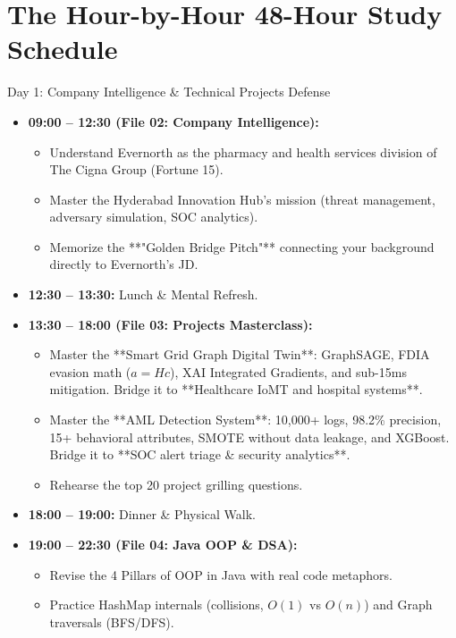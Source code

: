 \documentclass[11pt,a4paper]{article}
\begin{document}
\section{The Hour-by-Hour 48-Hour Study Schedule}

\begin{ansbox}{Day 1: Company Intelligence \& Technical Projects Defense}
\begin{itemize}
    \item \textbf{09:00 -- 12:30 (File 02: Company Intelligence):}
    \begin{itemize}
        \item Understand Evernorth as the pharmacy and health services division of The Cigna Group (Fortune 15).
        \item Master the Hyderabad Innovation Hub's mission (threat management, adversary simulation, SOC analytics).
        \item Memorize the **"Golden Bridge Pitch"** connecting your background directly to Evernorth's JD.
    \end{itemize}
    \item \textbf{12:30 -- 13:30:} Lunch \& Mental Refresh.
    \item \textbf{13:30 -- 18:00 (File 03: Projects Masterclass):}
    \begin{itemize}
        \item Master the **Smart Grid Graph Digital Twin**: GraphSAGE, FDIA evasion math ($a=Hc$), XAI Integrated Gradients, and sub-15ms mitigation. Bridge it to **Healthcare IoMT and hospital systems**.
        \item Master the **AML Detection System**: 10,000+ logs, 98.2\% precision, 15+ behavioral attributes, SMOTE without data leakage, and XGBoost. Bridge it to **SOC alert triage \& security analytics**.
        \item Rehearse the top 20 project grilling questions.
    \end{itemize}
    \item \textbf{18:00 -- 19:00:} Dinner \& Physical Walk.
    \item \textbf{19:00 -- 22:30 (File 04: Java OOP \& DSA):}
    \begin{itemize}
        \item Revise the 4 Pillars of OOP in Java with real code metaphors.
        \item Practice HashMap internals (collisions, $O(1)$ vs $O(n)$) and Graph traversals (BFS/DFS).
    \end{itemize}
\end{itemize}
\end{ansbox}
\end{document}
